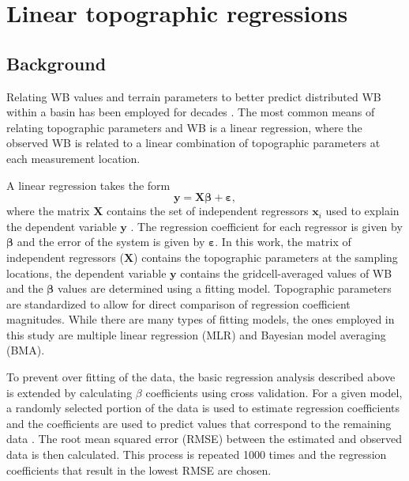 \documentclass{sfuthesis}
\renewcommand{\vector}[1]{\mathbf{#1}}
\begin{document}
\section{Linear topographic regressions}
\label{sec:linearregression}

\subsection{Background}
Relating WB values and terrain parameters to better predict distributed WB within a basin has been employed for decades \citep[e.g.][]{Woo1978, Molotch2005, McGrath2015}. The most common means of relating topographic parameters and WB is a linear regression, where the observed WB is related to a linear combination of topographic parameters at each measurement location. 

A linear regression takes the form
\begin{equation}
\vector{y} = \vector{X} \bm{\beta} + \bm{\varepsilon},
\end{equation}
where the matrix $\vector{X}$ contains the set of independent regressors $\vector{x}_i$ used to explain the dependent variable $\vector{y}$ \citep[e.g.][]{Davis1986}. The regression coefficient for each regressor is given by $\bm{\beta}$ and the error of the system is given by $\bm{\varepsilon}$. In this work, the matrix of independent regressors ($\vector{X}$) contains the topographic parameters at the sampling locations, the dependent variable $\vector{y}$ contains the gridcell-averaged values of WB and the $\bm{\beta}$ values are determined using a fitting model. Topographic parameters are standardized to allow for direct comparison of regression coefficient magnitudes. While there are many types of fitting models, the ones employed in this study are multiple linear regression (MLR) and Bayesian model averaging (BMA).

To prevent over fitting of the data, the basic regression analysis described above is extended by calculating $\beta$ coefficients using cross validation. For a given model, a randomly selected portion of the data is used to estimate regression coefficients and the coefficients are used to predict values that correspond to the remaining data \citep{Kohavi1995}. The root mean squared error (RMSE) between the estimated and observed data is then calculated. This process is repeated 1000 times and the regression coefficients that result in the lowest RMSE are chosen. 
\end{document}
